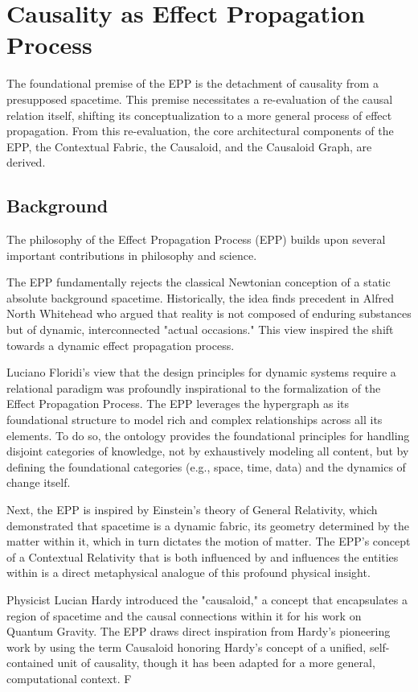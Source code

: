 \section{Causality as Effect Propagation Process}
\label{sec:epp}

The foundational premise of the EPP is the detachment of causality from a presupposed spacetime. This premise necessitates a re-evaluation of the causal relation itself, shifting its conceptualization to a more general process of effect propagation. From this re-evaluation, the core architectural 
components of the EPP, the Contextual Fabric, the Causaloid, and the Causaloid Graph, are derived.


\subsection{Background}
\label{sec:epp_background}

The philosophy of the Effect Propagation Process (EPP) builds upon several important contributions in philosophy and science. 

The EPP fundamentally rejects the classical Newtonian conception of a static absolute background spacetime. Historically, the idea finds precedent in Alfred North Whitehead who argued that reality is not composed of enduring substances but of dynamic, interconnected "actual occasions." This view inspired the shift towards a dynamic effect propagation process. 

Luciano Floridi's view that the design principles for  dynamic systems require a relational paradigm was profoundly inspirational to the formalization of the Effect Propagation Process. The EPP leverages the hypergraph as its foundational structure to model rich and complex relationships across all its elements. To do so, the ontology provides the foundational principles for handling disjoint categories of knowledge, not by exhaustively modeling all content, but by defining the foundational categories (e.g., space, time, data) and the dynamics of change itself.

Next, the EPP is inspired by Einstein's theory of General Relativity, which demonstrated that spacetime is a dynamic fabric, its geometry determined by the matter within it, which in turn dictates the motion of matter. The EPP's concept of a Contextual Relativity that is both influenced by and influences the entities within is a direct metaphysical analogue of this profound physical insight. 

Physicist Lucian Hardy introduced the "causaloid," a concept that encapsulates a region of spacetime and the causal connections within it for his work on Quantum Gravity. The EPP draws direct inspiration from Hardy’s pioneering work by using the term Causaloid honoring Hardy's concept of a unified, self-contained unit of causality, though it has been adapted for a more general, computational context. F


